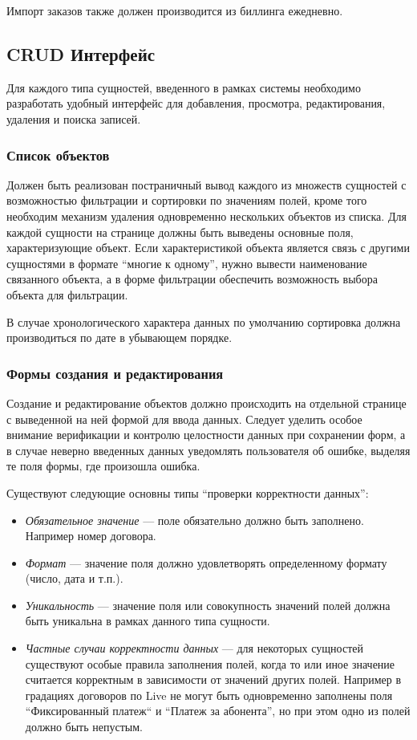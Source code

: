 Импорт заказов также должен производится из биллинга ежедневно.

\subsection{CRUD Интерфейс} 
Для каждого типа сущностей, введенного в рамках системы необходимо разработать удобный интерфейс для добавления, 
просмотра, редактирования, удаления и поиска записей.

\subsubsection{Список объектов}
\label{crud:list}
Должен быть реализован постраничный вывод каждого из множеств сущностей с возможностью фильтрации и сортировки
по значениям полей, кроме того необходим механизм удаления одновременно нескольких объектов из списка.
Для каждой сущности на странице должны быть выведены основные поля, характеризующие объект.
Если характеристикой объекта является связь с другими сущностями в формате ``многие к одному'',
нужно вывести наименование связанного объекта, а в форме фильтрации обеспечить возможность выбора объекта
для фильтрации. 

В случае хронологического характера данных по умолчанию сортировка должна производиться по дате в убывающем порядке.

\subsubsection{Формы создания и редактирования}
Создание и редактирование объектов должно происходить на отдельной странице с выведенной на ней формой для ввода данных.
Следует уделить особое внимание верификации и контролю целостности данных при сохранении форм, а в случае неверно
введенных данных уведомлять пользователя об ошибке, выделяя те поля формы, где произошла ошибка.

Существуют следующие основны типы ``проверки корректности данных'':
\begin{itemize}
\item{
  \textit{Обязательное значение} --- поле обязательно должно быть заполнено. Например номер договора. 
}
\item{
  \textit{Формат} --- значение поля должно удовлетворять определенному формату (число, дата и т.п.).
}
\item{
  \textit{Уникальность} --- значение поля или совокупность значений полей должна быть уникальна в рамках
данного типа сущности.
}
\item{
  \textit{Частные случаи корректности данных} --- для некоторых сущностей существуют особые правила заполнения полей,
  когда то или иное значение считается корректным в зависимости от значений других полей. 
  Например в градациях договоров по Live не могут быть одновременно заполнены поля ``Фиксированный платеж`` 
  и ``Платеж за абонента'', но при этом одно из полей должно быть непустым.
}
\end{itemize}

